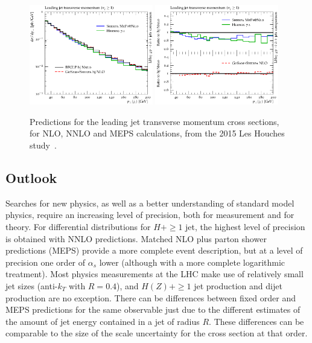 \documentclass[aps,prd,onecolumn,fleqn,superscriptaddress,groupedaddress,nofootinbib,preprintnumbers,nobalancelastpage]{revtex4}
\begin{document}
\begin{figure}[t]
  \centerline{\includegraphics[width=0.48\textwidth]{plots/zhjets_main.pdf}\hfill
    \includegraphics[width=0.48\textwidth]{plots/zhjets_ratio.pdf}}
  \caption{Predictions for the leading jet transverse momentum cross sections, for NLO, 
    NNLO and MEPS calculations, from the 2015 Les Houches study~\cite{Badger:2016bpw}.\label{fig:SM_Higgs_jet_R:ratio}}
\end{figure}


\subsection{Outlook}
Searches for new physics, as well as a better understanding of standard model
physics, require an increasing level of precision, both for measurement and for
theory. For differential distributions for $H+\ge1$ jet, the highest level of
precision is obtained with NNLO predictions. Matched NLO plus parton shower
predictions (MEPS) provide a more complete event description, but at a level of
precision one order of $\alpha_s$ lower (although with a more complete
logarithmic treatment).  Most physics measurements at the LHC make use of
relatively small jet sizes (anti-$k_T$ with $R=0.4$), and $H(Z)+\ge1$ jet production and dijet
production are no
exception.  There can be differences between fixed order and MEPS predictions
for the same observable just due to the different estimates of the amount of jet
energy contained in a jet of radius $R$. These differences can be comparable to
the size of the scale uncertainty for the cross section at that order. 
\end{document}
